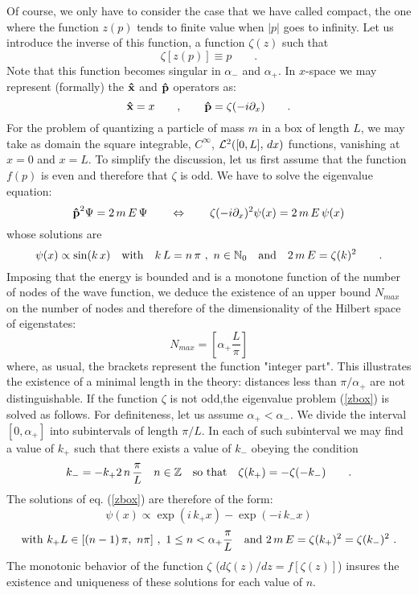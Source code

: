 \documentclass[a4paper,10pt]{article}
\newcommand{\x}{\mbox{\rm{\bf \^ x}}}
\newcommand{\p}{\mbox{\rm{\bf \^ p}}}
\newcommand{\cL}{{\cal L}}
\newcommand{\ZZ}{\mathbb Z}
\newcommand{\NN}{\mathbb N}
\begin{document}
Of course, we only have to consider the case that we have called
compact, the one where the function $z(p)$ tends to finite value
when $|p|$ goes to infinity. Let us introduce the inverse of this
function, a function $\zeta(z)$ such that
\begin{equation}
\zeta[z(p)]\equiv p\qquad .
\end{equation}
Note that this function becomes singular in $\alpha_-$ and
$\alpha_+$. In $x$-space we may represent (formally) the $\x$ and
$\p$ operators as:
\begin{equation}
\x = x\qquad,\qquad \p=\zeta(-i\partial_x)\qquad .
\end{equation}
For the problem of quantizing a particle of mass $m$ in a box of
length $L$, we may take as domain the square integrable,
$C^\infty$, $\cL^2([0,L],\, dx)$ functions, vanishing at $x=0$ and
$x=L$. To simplify the discussion, let us first assume that the
function $f(p)$ is even and therefore that $\zeta$ is odd. We have
to solve the eigenvalue equation:
\begin{equation}\label{zbox}
\p^2\Psi=2\,m\,E\,\Psi \qquad \Leftrightarrow\qquad
\zeta(-i\partial_x)^2\psi(x)=2\,m\,E\,\psi(x)
\end{equation}
whose solutions are
\begin{equation}
\psi(x)\propto \sin(k\,x)\quad {\rm with}\quad k\,L=n\,\pi\ ,\
n\in\NN_0\quad{\rm and}\quad 2\,m\,E=\zeta(k)^2\qquad .
\end{equation}
Imposing that the energy is bounded and is a monotone function of
the number of nodes of the wave function, we deduce the existence
of an upper bound $N_{max}$ on the number of nodes and therefore
of the dimensionality of the Hilbert space of eigenstates:
\begin{equation}
N_{max}=\left[\alpha_+\frac L\pi\right]
\end{equation}
where, as usual, the brackets represent the function "integer
part". This illustrates the existence of a minimal length in the
theory: distances less than $\pi/\alpha_+$ are not
distinguishable. If the function $\zeta$ is not odd,the eigenvalue
problem (\ref{zbox}) is solved as follows. For definiteness, let
us assume $\alpha_+<\alpha_-$. We divide the interval
$[0,\alpha_+]$ into subintervals of length $\pi/L$. In each of
such subinterval we may find a value of $k_+$ such that there
exists a value of $k_-$ obeying the condition \begin{equation}
k_-=-k_+2\,n\,\frac \pi L\quad n\in \ZZ\quad{\rm so\ that
}\quad\zeta(k_+)=-\zeta(-k_-)\qquad.
\end{equation}
The solutions of eq. (\ref{zbox}) are therefore of the form:
\begin{equation}
\psi(x)\propto \exp(i\,k_+x)-\exp(-i\,k_-x)
\end{equation}
\begin{equation}
{\rm with}\ k_+L\in [(n-1)\,\pi,\ n\pi]\ ,\ 1\leq n< \alpha_+\frac
\pi L\quad{\rm and}\ 2\,m\,E=\zeta(k_+)^2=\zeta(k_-)^2\ .\nonumber
\end{equation}
The monotonic behavior of the function $\zeta$ ($d\zeta(z)/dz
=f[\zeta(z)]$) insures the existence and uniqueness of these
solutions for each value of $n$.
\end{document}
